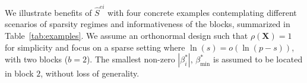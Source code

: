\documentclass[
  12pt]{article}
\newcommand{\bX}{\mathbf{X}}
\begin{document}


We illustrate benefits of $\hat S^{ei}$ with four concrete examples contemplating different scenarios of sparsity regimes and informativeness of the blocks, summarized in Table~\ref{tab:examples}. We assume an orthonormal design such that $\rho(\bX)=1$ for simplicity and focus on a sparse setting where $\ln(s)=o(\ln(p-s))$, with two blocks ($b=2$). The smallest non-zero $|\beta_i^*|$, $\beta_{\min}^*$ is assumed to be located in block $2$, without loss of generality. 
\end{document}
